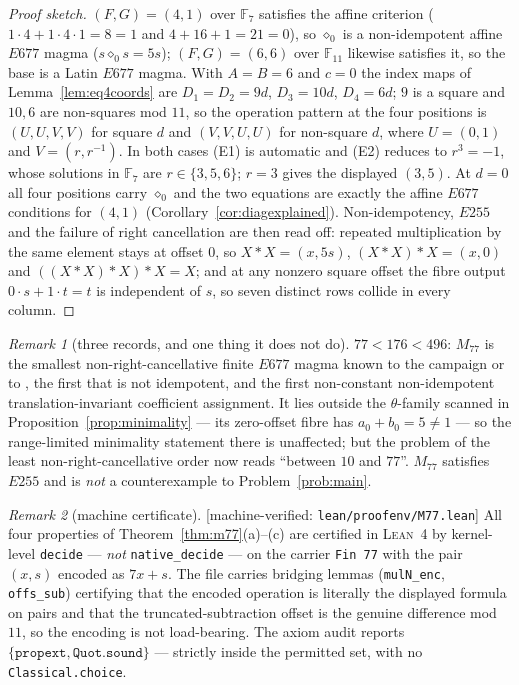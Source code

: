 \documentclass[11pt]{article}
\theoremstyle{plain}
\theoremstyle{definition}
\theoremstyle{remark}
\newtheorem*{remark*}{Remark}
\numberwithin{equation}{section}
\newcommand{\F}{\mathbb{F}}
\newcommand{\op}{\mathbin{*}}
\newcommand{\statusbox}[1]{{\small\sloppy\textsf{[#1]}}}
\newcommand{\MV}[1]{\statusbox{machine-verified: \texttt{#1}}}
\begin{document}
\begin{proof}[Proof sketch]
$(F,G) = (4,1)$ over $\F_7$ satisfies the affine criterion
($1\cdot4+1\cdot4\cdot1 = 8 = 1$ and $4+16+1 = 21 = 0$), so $\diamond_0$ is a
non-idempotent affine $E677$ magma ($s\diamond_0s = 5s$); $(F,G) = (6,6)$ over
$\F_{11}$ likewise satisfies it, so the base is a Latin $E677$ magma. With
$A = B = 6$ and $c = 0$ the index maps of Lemma~\ref{lem:eq4coords} are
$D_1 = D_2 = 9d$, $D_3 = 10d$, $D_4 = 6d$; $9$ is a square and $10,6$ are
non-squares mod $11$, so the operation pattern at the four positions is
$(U,U,V,V)$ for square $d$ and $(V,V,U,U)$ for non-square $d$, where $U = (0,1)$
and $V = (r,r^{-1})$. In both cases (E1) is automatic and (E2) reduces to
$r^3 = -1$, whose solutions in $\F_7$ are $r\in\{3,5,6\}$; $r = 3$ gives the
displayed $(3,5)$. At $d = 0$ all four positions carry $\diamond_0$ and the two
equations are exactly the affine $E677$ conditions for $(4,1)$
(Corollary~\ref{cor:diagexplained}). Non-idempotency, $E255$ and the failure of
right cancellation are then read off: repeated multiplication by the same element
stays at offset $0$, so $X\op X = (x,5s)$, $(X\op X)\op X = (x,0)$ and
$((X\op X)\op X)\op X = X$; and at any nonzero square offset the fibre output
$0\cdot s+1\cdot t = t$ is independent of $s$, so seven distinct rows collide in
every column.
\end{proof}

\begin{remark*}[three records, and one thing it does not do]
$77 < 176 < 496$: $M_{77}$ is the smallest non-right-cancellative finite $E677$
magma known to the campaign or to \cite{R4}, the first that is not idempotent, and
the first non-constant non-idempotent translation-invariant coefficient
assignment. It lies outside the $\theta$-family scanned in
Proposition~\ref{prop:minimality} --- its zero-offset fibre has $a_0+b_0 = 5\ne1$
--- so the range-limited minimality statement there is unaffected; but the problem
of the least non-right-cancellative order now reads ``between $10$ and $77$''.
$M_{77}$ satisfies $E255$ and is \emph{not} a counterexample to
Problem~\ref{prob:main}.
\end{remark*}

\begin{remark*}[machine certificate]
\MV{lean\slash proofenv\slash M77.lean}
All four properties of Theorem~\ref{thm:m77}(a)--(c) are certified in \textsc{Lean}~4
by kernel-level \texttt{decide} --- \emph{not} \texttt{native\_decide} --- on the
carrier \texttt{Fin 77} with the pair $(x,s)$ encoded as $7x+s$. The file carries
bridging lemmas (\texttt{mulN\_enc}, \texttt{offs\_sub}) certifying that the
encoded operation is literally the displayed formula on pairs and that the
truncated-subtraction offset is the genuine difference mod $11$, so the encoding
is not load-bearing. The axiom audit reports $\{\texttt{propext},
\texttt{Quot.sound}\}$ --- strictly inside the permitted set, with no
\texttt{Classical.choice}.
\end{remark*}
\end{document}
